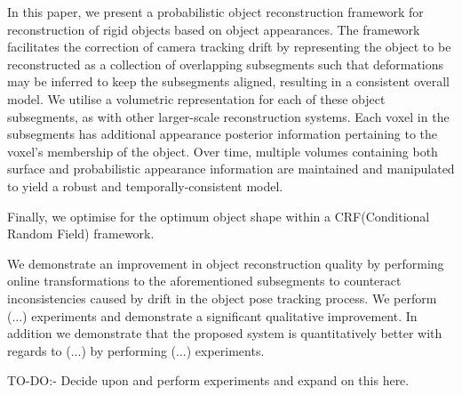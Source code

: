In this paper, we present a probabilistic object reconstruction framework for reconstruction of rigid objects based on object
appearances. The framework facilitates the correction of camera tracking drift by representing the object to be reconstructed as a
collection of overlapping subsegments such that deformations may be inferred to keep the subsegments aligned, resulting in a consistent
overall model. We utilise a volumetric representation for each of these object subsegments, as with other larger-scale reconstruction
systems\cite{Kahler2016}. Each voxel in the subsegments has additional appearance posterior information pertaining to the voxel's membership 
of the object. Over time, multiple volumes containing both surface and probabilistic appearance information are maintained and manipulated to 
yield a robust and temporally-consistent model.

Finally, we optimise for the optimum object shape within a CRF(Conditional Random Field) framework.

We demonstrate an improvement in object reconstruction quality by performing online transformations to the aforementioned subsegments to counteract inconsistencies 
caused by drift in the object pose tracking process. 
We perform (...) experiments and demonstrate a significant qualitative improvement. In addition we demonstrate that the proposed system is quantitatively better 
with regards to (...) by performing (...) experiments.

TO-DO:- Decide upon and perform experiments and expand on this here.